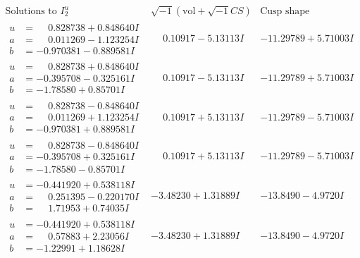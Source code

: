 \documentclass[1p]{elsarticle_modified}
\theoremstyle{definition}
\newcommand{\I}{\sqrt{-1}}
\begin{document}
$$\begin{array}{c|c|c}  
\text{Solutions to }I^u_{2}& \I (\text{vol} + \sqrt{-1}CS) & \text{Cusp shape}\\
 \hline 
\begin{aligned}
u &= \phantom{-}0.828738 + 0.848640 I \\
a &= \phantom{-}0.011269 - 1.123254 I \\
b &= -0.970381 - 0.889581 I\end{aligned}
 & \phantom{-}0.10917 - 5.13113 I & -11.29789 + 5.71003 I \\ \hline\begin{aligned}
u &= \phantom{-}0.828738 + 0.848640 I \\
a &= -0.395708 - 0.325161 I \\
b &= -1.78580 + 0.85701 I\end{aligned}
 & \phantom{-}0.10917 - 5.13113 I & -11.29789 + 5.71003 I \\ \hline\begin{aligned}
u &= \phantom{-}0.828738 - 0.848640 I \\
a &= \phantom{-}0.011269 + 1.123254 I \\
b &= -0.970381 + 0.889581 I\end{aligned}
 & \phantom{-}0.10917 + 5.13113 I & -11.29789 - 5.71003 I \\ \hline\begin{aligned}
u &= \phantom{-}0.828738 - 0.848640 I \\
a &= -0.395708 + 0.325161 I \\
b &= -1.78580 - 0.85701 I\end{aligned}
 & \phantom{-}0.10917 + 5.13113 I & -11.29789 - 5.71003 I \\ \hline\begin{aligned}
u &= -0.441920 + 0.538118 I \\
a &= \phantom{-}0.251395 - 0.220170 I \\
b &= \phantom{-}1.71953 + 0.74035 I\end{aligned}
 & -3.48230 + 1.31889 I & -13.8490 - 4.9720 I \\ \hline\begin{aligned}
u &= -0.441920 + 0.538118 I \\
a &= \phantom{-}0.57883 + 2.23056 I \\
b &= -1.22991 + 1.18628 I\end{aligned}
 & -3.48230 + 1.31889 I & -13.8490 - 4.9720 I \\ \hline\begin{aligned}

\end{aligned}
\end{array}$$
\end{document}
